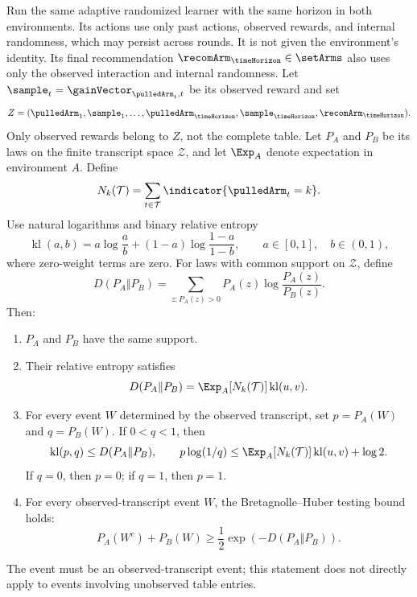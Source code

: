 \begin{lemma}[\textcolor{titleTh}{Change of measure for observed transcripts}]
Run the same adaptive randomized learner with the same horizon in both
environments. Its actions use only past actions, observed rewards,
and internal randomness, which may persist across rounds. It is not
given the environment's identity. Its final recommendation
$\recomArm_{\timeHorizon}\in\setArms$ also uses only the observed
interaction and internal randomness.
Let $\sample_t=\gainVector_{\pulledArm_t,t}$ be its observed reward and set
\[
Z=(\pulledArm_1,\sample_1,\ldots,
\pulledArm_{\timeHorizon},\sample_{\timeHorizon},\recomArm_{\timeHorizon}).
\]
Only observed rewards belong to $Z$, not the complete table.
Let $P_A$ and $P_B$ be its laws on the finite transcript space
$\mathcal Z$, and let $\Exp_A$ denote expectation in environment $A$.
Define
\[
N_k(\mathcal T)=\sum_{t\in\mathcal T}\indicator{\pulledArm_t=k}.
\]
Use natural logarithms and binary relative entropy
\[
\operatorname{kl}(a,b)
=a\log\frac{a}{b}+(1-a)\log\frac{1-a}{1-b},
\qquad a\in[0,1],\quad b\in(0,1),
\]
where zero-weight terms are zero. For laws with common support on
$\mathcal Z$, define
\[
D(P_A\Vert P_B)
=\sum_{z:P_A(z)>0}P_A(z)\log\frac{P_A(z)}{P_B(z)}.
\]
Then:
\begin{enumerate}[label=(\roman*)]
\item $P_A$ and $P_B$ have the same support.
\item Their relative entropy satisfies
\[
D(P_A\Vert P_B)=\Exp_A[N_k(\mathcal T)]\operatorname{kl}(u,v).
\]
\item For every event $W$ determined by the observed transcript, set
$p=P_A(W)$ and $q=P_B(W)$. If $0<q<1$, then
\[
\operatorname{kl}(p,q)\leq D(P_A\Vert P_B),
\qquad
p\log(1/q)\leq\Exp_A[N_k(\mathcal T)]\operatorname{kl}(u,v)+\log2.
\]
If $q=0$, then $p=0$; if $q=1$, then $p=1$.
\item For every observed-transcript event $W$, the
Bretagnolle--Huber testing bound holds:
\begin{equation}\label{eq:transcriptTesting}
P_A(W^c)+P_B(W)\geq\frac12\exp\left(-D(P_A\Vert P_B)\right).
\end{equation}
\end{enumerate}
The event must be an observed-transcript event; this statement does
not directly apply to events involving unobserved table entries.
\end{lemma}

